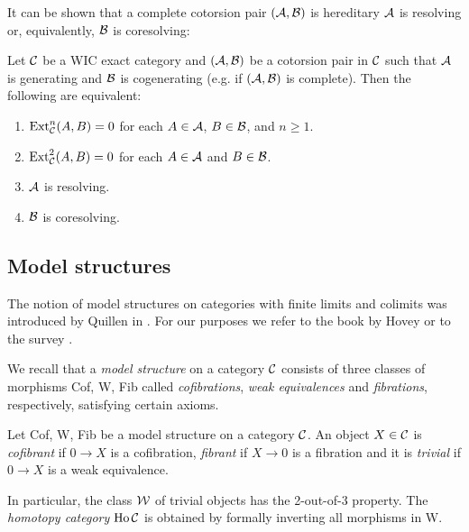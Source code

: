 It can be shown that a complete cotorsion pair $(\mathcal{A}, \mathcal{B})$ is hereditary \iff $\mathcal{A}$ is resolving or, equivalently, \iff $\mathcal{B}$ is coresolving:
\begin{lem}{\cite[Lemma~6.17]{Sto13}}
  Let $\mathcal{C}$ be a WIC exact category and $(\mathcal{A},\mathcal{B})$ be a cotorsion pair in $\mathcal{C}$ such that $\mathcal{A}$ is generating and $\mathcal{B}$ is cogenerating (e.g. if $(\mathcal{A},\mathcal{B})$ is complete). Then the following are equivalent:
  \begin{enumerate}
    \item $\operatorname{Ext}^n_{\mathcal{C}}(A,B)=0$ for each $A\in\mathcal{A}$, $B\in\mathcal{B}$, and $n\geq 1$.
    \item $\operatorname{Ext}^2_{\mathcal{C}}(A,B)=0$ for each $A\in\mathcal{A}$ and $B\in\mathcal{B}$.
    \item $\mathcal{A}$ is resolving.
    \item $\mathcal{B}$ is coresolving.
  \end{enumerate}
\end{lem}

%
%
%

\subsection{Model structures}\label{S:model}
The notion of model structures on categories with finite limits and colimits was introduced by Quillen in \cite{QHtp}.
For our purposes we refer to the book by Hovey \cite{Hov99} or to the survey \cite{Sto13}.

We recall that a \emph{model structure} on a category $\mathcal{C}$ consists
of three classes of morphisms Cof, W, Fib called \emph{cofibrations}, \emph{weak equivalences} and \emph{fibrations}, respectively, satisfying certain axioms.

\begin{defn}
  Let Cof, W, Fib be a model structure on a category $\mathcal{C}$.
  An object $X\in \mathcal{C}$ is \emph{cofibrant} if $0\to X$ is a cofibration,  \emph{fibrant} if $X\to 0$ is a fibration and it is \emph{trivial} if $0\to X$ is a weak equivalence.
\end{defn}

In particular, the class $\mathcal{W}$ of trivial objects has the 2-out-of-3 property.
 The \emph{homotopy category} $\operatorname{Ho} \mathcal{C}$ is obtained by  formally inverting all morphisms in W.

